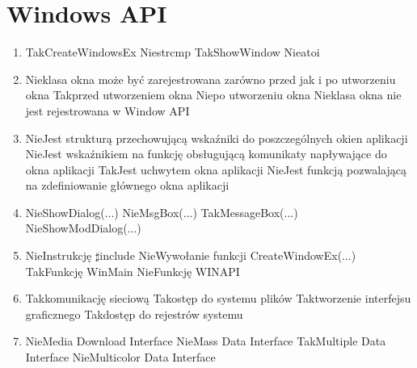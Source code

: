 


\newpage
\section{Windows API}

\begin{enumerate}
	
	\item {}
	{Tak}{CreateWindowsEx}
	{Nie}{strcmp}
	{Tak}{ShowWindow}
	{Nie}{atoi}
	
	\item {}
	{Nie}{klasa okna może być zarejestrowana zarówno przed jak i po utworzeniu okna}
	{Tak}{przed utworzeniem okna}
	{Nie}{po utworzeniu okna}
	{Nie}{klasa okna nie jest rejestrowana w Window API}
	
	\item {}
	{Nie}{Jest strukturą przechowującą wskaźniki do poszczególnych okien aplikacji}
	{Nie}{Jest wskaźnikiem na funkcję obsługującą komunikaty napływające do okna aplikacji}
	{Tak}{Jest uchwytem okna aplikacji}
	{Nie}{Jest funkcją pozwalającą na zdefiniowanie głównego okna aplikacji}
	
	\item {}
	{Nie}{ShowDialog(...)}
	{Nie}{MsgBox(...)}
	{Tak}{MessageBox(...)}
	{Nie}{ShowModDialog(...)}
	
	\item {}
	{Nie}{Instrukcję $\sharp$include}
	{Nie}{Wywołanie funkcji CreateWindowEx(...)}
	{Tak}{Funkcję WinMain}
	{Nie}{Funkcję WINAPI}
	
	\item {}
	{Tak}{komunikację sieciową}
	{Tak}{ostęp do systemu plików}
	{Tak}{tworzenie interfejsu graficznego}
	{Tak}{dostęp do rejestrów systemu}

	\item {}
	{Nie}{Media Download Interface}
	{Nie}{Mass Data Interface}
	{Tak}{Multiple Data Interface}
	{Nie}{Multicolor Data Interface}


\end{enumerate}
